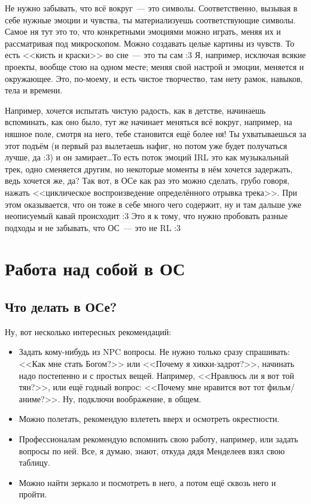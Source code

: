 \documentclass[a5paper,12pt,twoside]{memoir}
\begin{document}
Не нужно забывать, что всё вокруг~--- это символы. Соответственно, вызывая в себе нужные эмоции и чувства, ты материализуешь соответствующие символы. Самое ня тут это то, что конкретными эмоциями можно играть, меняя их и рассматривая под микроскопом. Можно создавать целые картины из чувств. То есть <<кисть и краски>> во сне~--- это ты сам :3 Я, например, исключая всякие проекты, вообще стою на одном месте; меняя свой настрой и эмоции, меняется и окружающее. Это, по-моему, и есть чистое творчество, там нету рамок, навыков, тела и времени.
 
Например, хочется испытать чистую радость, как в детстве, начинаешь вспоминать, как оно было, тут же начинает меняться всё вокруг, например, на няшное поле, смотря на него, тебе становится ещё более ня! Ты ухватываешься за этот подъём (и первый раз вылетаешь нафиг, но потом уже будет получаться лучше, да :3) и он замирает\ldots То есть поток эмоций IRL это как музыкальный трек, одно сменяется другим, но некоторые моменты в нём хочется задержать, ведь хочется же, да? Так вот, в ОСе как раз это можно сделать, грубо говоря, нажать <<циклическое воспроизведение определённого отрывка трека>>. При этом оказывается, что он тоже в себе много чего содержит, ну и там дальше уже неописуемый кавай происходит :3 Это я к тому, что нужно пробовать разные подходы и не забывать, что ОС~--- это не RL :3




\chapter{Работа над собой в ОС}


\section{Что делать в ОСе?}
Ну, вот несколько интересных рекомендаций:
\begin{itemize}
\item Задать кому-нибудь из NPC вопросы. Не нужно только сразу спрашивать: <<Как мне стать Богом?>> или <<Почему я хикки-задрот?>>, начинать надо постепенно и с простых вещей. Например, <<Нравлюсь ли я вот той тян?>>, или ещё годный вопрос: <<Почему мне нравится вот тот фильм/ани\-ме?>>. Ну, подключи воображение, в общем.
\item Можно полетать, рекомендую взлететь вверх и осмотреть окрестности.
\item Профессионалам рекомендую вспомнить свою работу, например, или задать вопросы по ней. Все, я думаю, знают, откуда дядя Менделеев взял свою таблицу.
\item Можно найти зеркало и посмотреть в него, а потом ещё сквозь него и пройти.
\end{itemize}
\end{document}
